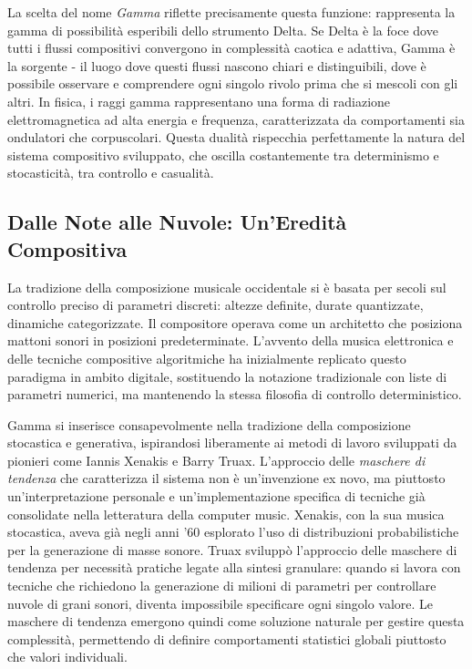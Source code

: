 La scelta del nome \textit{Gamma} riflette precisamente questa funzione: rappresenta la gamma di possibilità esperibili dello strumento Delta. Se Delta è la foce dove tutti i flussi compositivi convergono in complessità caotica e adattiva, Gamma è la sorgente - il luogo dove questi flussi nascono chiari e distinguibili, dove è possibile osservare e comprendere ogni singolo rivolo prima che si mescoli con gli altri. In fisica, i raggi gamma rappresentano una forma di radiazione elettromagnetica ad alta energia e frequenza, caratterizzata da comportamenti sia ondulatori che corpuscolari. Questa dualità rispecchia perfettamente la natura del sistema compositivo sviluppato, che oscilla costantemente tra determinismo e stocasticità, tra controllo e casualità.
\subsection{Dalle Note alle Nuvole: Un'Eredità Compositiva}
La tradizione della composizione musicale occidentale si è basata per secoli sul controllo preciso di parametri discreti: altezze definite, durate quantizzate, dinamiche categorizzate. Il compositore operava come un architetto che posiziona mattoni sonori in posizioni predeterminate. L'avvento della musica elettronica e delle tecniche compositive algoritmiche ha inizialmente replicato questo paradigma in ambito digitale, sostituendo la notazione tradizionale con liste di parametri numerici, ma mantenendo la stessa filosofia di controllo deterministico.

Gamma si inserisce consapevolmente nella tradizione della composizione stocastica e generativa, ispirandosi liberamente ai metodi di lavoro sviluppati da pionieri come Iannis Xenakis e Barry Truax. L'approccio delle \textit{maschere di tendenza} che caratterizza il sistema non è un'invenzione ex novo, ma piuttosto un'interpretazione personale e un'implementazione specifica di tecniche già consolidate nella letteratura della computer music. Xenakis, con la sua musica stocastica, aveva già negli anni '60 esplorato l'uso di distribuzioni probabilistiche per la generazione di masse sonore. Truax sviluppò l'approccio delle maschere di tendenza per necessità pratiche legate alla sintesi granulare: quando si lavora con tecniche che richiedono la generazione di milioni di parametri per controllare nuvole di grani sonori, diventa impossibile specificare ogni singolo valore. Le maschere di tendenza emergono quindi come soluzione naturale per gestire questa complessità, permettendo di definire comportamenti statistici globali piuttosto che valori individuali.

